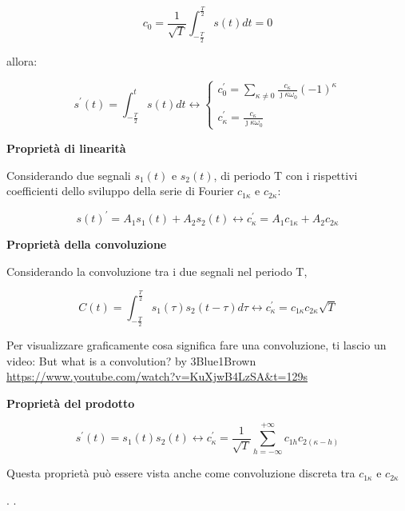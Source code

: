 {
    \Large 
    \begin{equation}
        c_0 
        = \frac{1}{\sqrt{T}} 
        \int_{-\frac{T}{2}}^{\frac{T}{2}}
        s(t) dt 
        = 
        0
    \end{equation}
}

allora: 

{
    \Large
    \begin{equation}
        s^{'} (t) = \int_{-\frac{T}{2}}^{t} s(t) dt 
        \leftrightarrow 
        \begin{cases}
            c_0 ^{'} = \sum_{\kappa \neq 0 } \frac{c_\kappa}{\jmath \kappa \omega_0} (-1)^{\kappa} \\ \\
            c_\kappa ^{'} = \frac{c_\kappa}{\jmath\kappa \omega_0}
        \end{cases}
   \end{equation}
}

\textbf{Proprietà di linearità}

Considerando due segnali $s_1 (t)$ e $s_2 (t)$, di periodo T con i rispettivi coefficienti dello sviluppo 
della serie di Fourier $c_{1\kappa}$ e $c_{2\kappa}$: 

{
    \Large
    \begin{equation}
        s(t) ^{'} = A_1 s_1 (t) + A_2 s_2 (t)
        \leftrightarrow 
        c_\kappa ^{'} = A_1 c_{1\kappa} + A_2 c_{2\kappa}  
    \end{equation}
}

\textbf{Proprietà della convoluzione} 

Considerando la convoluzione tra i due segnali nel periodo T, 

{
    \Large 
    \begin{equation}
        C(t) = \int_{-\frac{T}{2}}^{\frac{T}{2}} s_1 (\tau) s_2 (t - \tau) d\tau 
        \leftrightarrow 
        c_\kappa ^{'} = c_{1\kappa} c_{2\kappa} \sqrt{T}
    \end{equation}
} 


\begin{tcolorbox}
    Per visualizzare graficamente cosa significa fare una convoluzione, ti lascio un video: \newline 
    But what is a convolution? by 3Blue1Brown \newline
    \url{https://www.youtube.com/watch?v=KuXjwB4LzSA&t=129s}    
\end{tcolorbox}

\textbf{Proprietà del prodotto}

{
    \Large
    \begin{equation}
        s^{'} (t) = s_1 (t) s_2(t) 
        \leftrightarrow 
        c_\kappa ^{'} = \frac{1}{\sqrt{T}} \sum_{h = - \infty}^{+ \infty} c_{1 h} c_{2(\kappa - h)}
    \end{equation}
}

Questa proprietà può essere vista anche come convoluzione discreta tra ${c_{1\kappa}}$ e ${c_{2\kappa}}$ \newline 

\newpage
.
\newpage
.
\newpage


